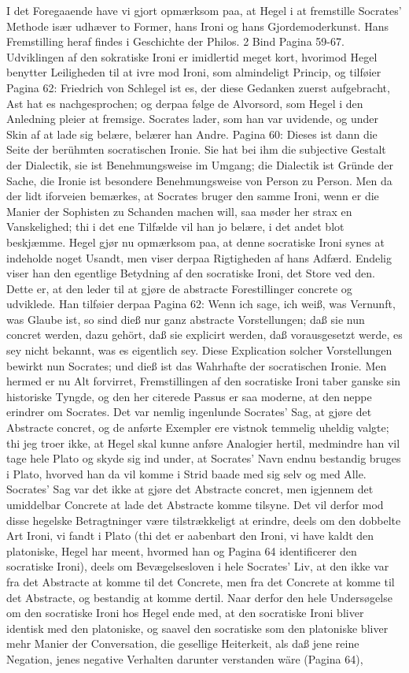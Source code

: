 \documentclass[12pt,a4paper]{article}
\begin{document}
I det Foregaaende have vi gjort opmærksom paa, at Hegel i at fremstille Socrates' Methode især udhæver to Former, hans Ironi og hans Gjordemoderkunst. Hans Fremstilling heraf findes i Geschichte der Philos. 2 Bind Pagina 59-67. Udviklingen af den sokratiske Ironi er imidlertid meget kort, hvorimod Hegel benytter Leiligheden til at ivre mod Ironi, som almindeligt Princip, og tilføier Pagina 62: Friedrich von Schlegel ist es, der diese Gedanken zuerst aufgebracht, Ast hat es nachgesprochen; og derpaa følge de Alvorsord, som Hegel i den Anledning pleier at fremsige. Socrates lader, som han var uvidende, og under Skin af at lade sig belære, belærer han Andre. Pagina 60: Dieses ist dann die Seite der berühmten socratischen Ironie. Sie hat bei ihm die subjective Gestalt der Dialectik, sie ist Benehmungsweise im Umgang; die Dialectik ist Gründe der Sache, die Ironie ist besondere Benehmungsweise von Person zu Person. Men da der lidt iforveien bemærkes, at Socrates bruger den samme Ironi, wenn er die Manier der Sophisten zu Schanden machen will, saa møder her strax en Vanskelighed; thi i det ene Tilfælde vil han jo belære, i det andet blot beskjæmme. Hegel gjør nu opmærksom paa, at denne socratiske Ironi synes at indeholde noget Usandt, men viser derpaa Rigtigheden af hans Adfærd. Endelig viser han den egentlige Betydning af den socratiske Ironi, det Store ved den. Dette er, at den leder til at gjøre de abstracte Forestillinger concrete og udviklede. Han tilføier derpaa Pagina 62: Wenn ich sage, ich weiß, was Vernunft, was Glaube ist, so sind dieß nur ganz abstracte Vorstellungen; daß sie nun concret werden, dazu gehört, daß sie explicirt werden, daß vorausgesetzt werde, es sey nicht bekannt, was es eigentlich sey. Diese Explication solcher Vorstellungen bewirkt nun Socrates; und dieß ist das Wahrhafte der socratischen Ironie. Men hermed er nu Alt forvirret, Fremstillingen af den socratiske Ironi taber ganske sin historiske Tyngde, og den her citerede Passus er saa moderne, at den neppe erindrer om Socrates. Det var nemlig ingenlunde Socrates' Sag, at gjøre det Abstracte concret, og de anførte Exempler ere vistnok temmelig uheldig valgte; thi jeg troer ikke, at Hegel skal kunne anføre Analogier hertil, medmindre han vil tage hele Plato og skyde sig ind under, at Socrates' Navn endnu bestandig bruges i Plato, hvorved han da vil komme i Strid baade med sig selv og med Alle. Socrates' Sag var det ikke at gjøre det Abstracte concret, men igjennem det umiddelbar Concrete at lade det Abstracte komme tilsyne. Det vil derfor mod disse hegelske Betragtninger være tilstrækkeligt at erindre, deels om den dobbelte Art Ironi, vi fandt i Plato (thi det er aabenbart den Ironi, vi have kaldt den platoniske, Hegel har meent, hvormed han og Pagina 64 identificerer den socratiske Ironi), deels om Bevægelsesloven i hele Socrates' Liv, at den ikke var fra det Abstracte at komme til det Concrete, men fra det Concrete at komme til det Abstracte, og bestandig at komme dertil. Naar derfor den hele Undersøgelse om den socratiske Ironi hos Hegel ende med, at den socratiske Ironi bliver identisk med den platoniske, og saavel den socratiske som den platoniske bliver mehr Manier der Conversation, die gesellige Heiterkeit, als daß jene reine Negation, jenes negative Verhalten darunter verstanden wäre (Pagina 64), 
\end{document}
